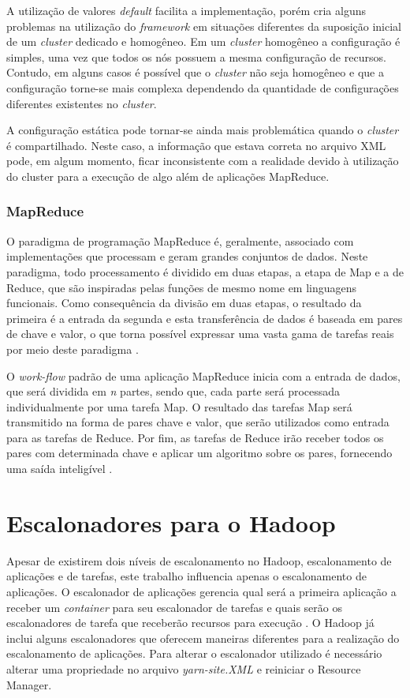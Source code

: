 A utilização de valores \textit{default} facilita a implementação, porém cria alguns problemas na utilização do \textit{framework} em situações diferentes da suposição inicial de um \textit{cluster} dedicado e homogêneo. Em um \textit{cluster} homogêneo a configuração é simples, uma vez que todos os nós possuem a mesma configuração de recursos. Contudo, em alguns casos é possível que o \textit{cluster} não seja homogêneo e que a configuração torne-se mais complexa dependendo da quantidade de configurações diferentes existentes no \textit{cluster}.

A configuração estática pode tornar-se ainda mais problemática quando o \textit{cluster} é compartilhado. Neste caso, a informação que estava correta no arquivo XML pode, em algum momento, ficar inconsistente com a realidade devido à utilização do cluster para a execução de algo além de aplicações MapReduce.
 
\subsubsection{MapReduce}
O paradigma de programação MapReduce é, geralmente, associado com implementações que processam e geram grandes conjuntos de dados. Neste paradigma, todo processamento é dividido em duas etapas, a etapa de Map e a de Reduce, que são inspiradas pelas funções de mesmo nome em linguagens funcionais. Como consequência da divisão em duas etapas, o resultado da primeira é a entrada da segunda e esta transferência de dados é baseada em pares de chave e valor, o que torna possível expressar uma vasta gama de tarefas reais por meio deste paradigma \cite{Dean}.

O \textit{work-flow} padrão de uma aplicação MapReduce inicia com a entrada de dados, que será dividida em \textit{n} partes, sendo que, cada parte será processada individualmente por uma tarefa Map. O resultado das tarefas Map será transmitido na forma de pares chave e valor, que serão utilizados como entrada para as tarefas de Reduce. Por fim, as tarefas de Reduce irão receber todos os pares com determinada chave e aplicar um algoritmo sobre os pares, fornecendo uma saída inteligível \cite{BookHadoop}.



\section{Escalonadores para o Hadoop}
\label{sec:HadSched}
Apesar de existirem dois níveis de escalonamento no Hadoop, escalonamento de aplicações e de tarefas, este trabalho influencia apenas o escalonamento de aplicações. O escalonador de aplicações gerencia qual será a primeira aplicação a receber um \textit{container} para seu escalonador de tarefas e quais serão os escalonadores de tarefa que receberão recursos para execução \cite{BookHadoop}. O Hadoop já inclui alguns escalonadores que oferecem maneiras diferentes para a realização do escalonamento de aplicações. Para alterar o escalonador utilizado é necessário alterar uma propriedade no arquivo \textit{yarn-site.XML} e reiniciar o Resource Manager.

